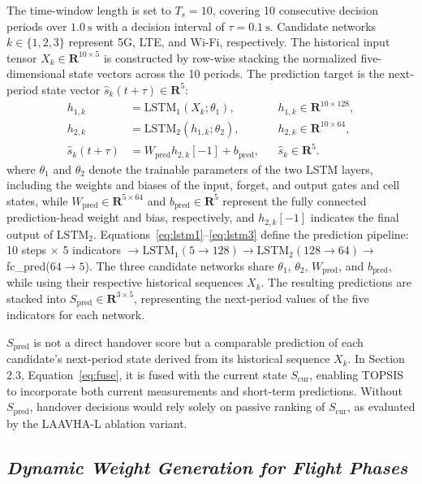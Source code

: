 \documentclass[10pt,a4paper]{article}
\begin{document}
The time-window length is set to $T_s=10$, covering 10 consecutive decision periods over $1.0~\mathrm{s}$ with a decision interval of $\tau=0.1~\mathrm{s}$. Candidate networks $k\in\{1,2,3\}$ represent 5G, LTE, and Wi-Fi, respectively. The historical input tensor $X_k\in\mathbf{R}^{10\times5}$ is constructed by row-wise stacking the normalized five-dimensional state vectors across the 10 periods. The prediction target is the next-period state vector $\hat{s}_k(t+\tau)\in\mathbf{R}^5$:
\begin{align}
h_{1,k} &= \mathrm{LSTM}_1(X_k;\theta_1), && h_{1,k}\in\mathbf{R}^{10\times128}, \label{eq:lstm1}\\
h_{2,k} &= \mathrm{LSTM}_2(h_{1,k};\theta_2), && h_{2,k}\in\mathbf{R}^{10\times64}, \label{eq:lstm2}\\
\hat{s}_k(t+\tau) &= W_{\mathrm{pred}}h_{2,k}[-1]+b_{\mathrm{pred}}, && \hat{s}_k\in\mathbf{R}^5. \label{eq:lstm3}
\end{align}
where $\theta_1$ and $\theta_2$ denote the trainable parameters of the two LSTM layers, including the weights and biases of the input, forget, and output gates and cell states, while $W_{\mathrm{pred}}\in\mathbf{R}^{5\times64}$ and $b_{\mathrm{pred}}\in\mathbf{R}^5$ represent the fully connected prediction-head weight and bias, respectively, and $h_{2,k}[-1]$ indicates the final output of $\mathrm{LSTM}_2$. Equations~\eqref{eq:lstm1}--\eqref{eq:lstm3} define the prediction pipeline: 10 steps $\times$ 5 indicators $\rightarrow\mathrm{LSTM}_1(5\rightarrow128)\rightarrow\mathrm{LSTM}_2(128\rightarrow64)\rightarrow$fc\_pred($64\rightarrow5$). The three candidate networks share $\theta_1$, $\theta_2$, $W_{\mathrm{pred}}$, and $b_{\mathrm{pred}}$, while using their respective historical sequences $X_k$. The resulting predictions are stacked into $S_{\mathrm{pred}}\in\mathbf{R}^{3\times5}$, representing the next-period values of the five indicators for each network.

$S_{\mathrm{pred}}$ is not a direct handover score but a comparable prediction of each candidate's next-period state derived from its historical sequence $X_k$. In Section 2.3, Equation~\eqref{eq:fuse}, it is fused with the current state $S_{\mathrm{cur}}$, enabling TOPSIS to incorporate both current measurements and short-term predictions. Without $S_{\mathrm{pred}}$, handover decisions would rely solely on passive ranking of $S_{\mathrm{cur}}$, as evaluated by the LAAVHA-L ablation variant.

\subsection{\textmd{\textit{Dynamic Weight Generation for Flight Phases}}}
\end{document}
